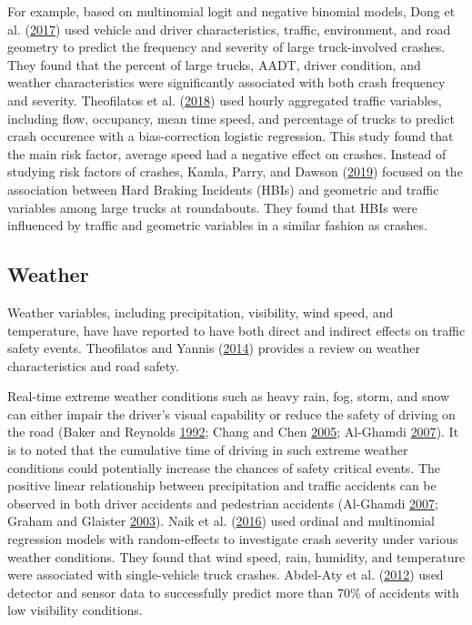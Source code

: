 \documentclass[12pt]{book}
\numberwithin{equation}{chapter}
\begin{document}
For example, based on multinomial logit and negative binomial models, Dong et al. (\protect\hyperlink{ref-dong2017estimating}{2017}) used vehicle and driver characteristics, traffic, environment, and road geometry to predict the frequency and severity of large truck-involved crashes. They found that the percent of large trucks, AADT, driver condition, and weather characteristics were significantly associated with both crash frequency and severity. Theofilatos et al. (\protect\hyperlink{ref-theofilatos2018impact}{2018}) used hourly aggregated traffic variables, including flow, occupancy, mean time speed, and percentage of trucks to predict crash occurence with a bias-correction logistic regression. This study found that the main risk factor, average speed had a negative effect on crashes. Instead of studying risk factors of crashes, Kamla, Parry, and Dawson (\protect\hyperlink{ref-kamla2019analysing}{2019}) focused on the association between Hard Braking Incidents (HBIs) and geometric and traffic variables among large trucks at roundabouts. They found that HBIs were influenced by traffic and geometric variables in a similar fashion as crashes.

\hypertarget{weather}{%
\subsection{Weather}\label{weather}}

Weather variables, including precipitation, visibility, wind speed, and temperature, have have reported to have both direct and indirect effects on traffic safety events. Theofilatos and Yannis (\protect\hyperlink{ref-theofilatos2014review}{2014}) provides a review on weather characteristics and road safety.

Real-time extreme weather conditions such as heavy rain, fog, storm, and snow can either impair the driver's visual capability or reduce the safety of driving on the road (Baker and Reynolds \protect\hyperlink{ref-baker1992wind}{1992}; Chang and Chen \protect\hyperlink{ref-chang2005data}{2005}; Al-Ghamdi \protect\hyperlink{ref-al2007experimental}{2007}). It is to noted that the cumulative time of driving in such extreme weather conditions could potentially increase the chances of safety critical events. The positive linear relationship between precipitation and traffic accidents can be observed in both driver accidents and pedestrian accidents (Al-Ghamdi \protect\hyperlink{ref-al2007experimental}{2007}; Graham and Glaister \protect\hyperlink{ref-graham2003spatial}{2003}). Naik et al. (\protect\hyperlink{ref-naik2016weather}{2016}) used ordinal and multinomial regression models with random-effects to investigate crash severity under various weather conditions. They found that wind speed, rain, humidity, and temperature were associated with single-vehicle truck crashes. Abdel-Aty et al. (\protect\hyperlink{ref-abdel2012real}{2012}) used detector and sensor data to successfully predict more than 70\% of accidents with low visibility conditions.
\end{document}
